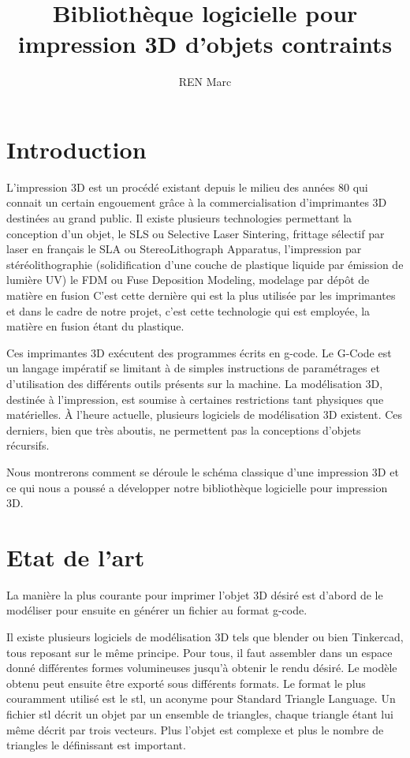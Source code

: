 \documentclass[a4paper,11pt]{article}
\title{Bibliothèque logicielle pour impression 3D d’objets contraints}
\author{REN Marc}
\begin{document}
\maketitle
\tableofcontents

\begin{abstract}
\end{abstract}

\section{Introduction}
L'impression 3D est un procédé existant depuis le milieu des années 80 qui connait un certain engouement grâce à la commercialisation d'imprimantes 3D destinées au grand public.
Il existe plusieurs technologies permettant la conception d'un objet,
le SLS ou Selective Laser Sintering, frittage sélectif par laser en français
le SLA ou StereoLithograph Apparatus, l'impression par stéréolithographie (solidification d'une couche de plastique liquide par émission de lumière UV)
le FDM ou Fuse Deposition Modeling, modelage par dépôt de matière en fusion
C'est cette dernière qui est la plus utilisée par les imprimantes et dans le  cadre de notre projet, c'est cette technologie qui est employée, la matière en fusion étant du plastique.

Ces imprimantes 3D exécutent des programmes écrits en g-code. 
Le G-Code est un langage impératif se limitant à de simples instructions de paramétrages et d'utilisation des différents outils présents sur la machine. 
La modélisation 3D, destinée à l’impression, est soumise à certaines restrictions tant physiques que matérielles. À l’heure actuelle, plusieurs logiciels de modélisation 3D existent. Ces derniers, bien que très aboutis, ne permettent pas la conceptions d’objets récursifs.

Nous montrerons comment se déroule le schéma classique d'une impression 3D et ce qui nous a poussé a développer notre bibliothèque logicielle pour impression 3D. 
\newpage

\section{Etat de l'art}
La manière la plus courante pour imprimer l'objet 3D désiré est d'abord de le modéliser pour ensuite en générer un fichier au format g-code.

Il existe plusieurs logiciels de modélisation 3D tels que blender ou bien Tinkercad, tous reposant sur le même principe. Pour tous, il faut assembler dans un espace donné différentes formes volumineuses jusqu'à obtenir le rendu désiré. Le modèle obtenu peut ensuite être exporté sous différents formats. Le format le plus couramment utilisé est le stl, un aconyme pour Standard Triangle Language. Un fichier stl décrit un objet par un ensemble de triangles, chaque triangle étant lui même décrit par trois vecteurs. Plus l'objet est complexe et plus le nombre de triangles le définissant est important.
\end{document}
